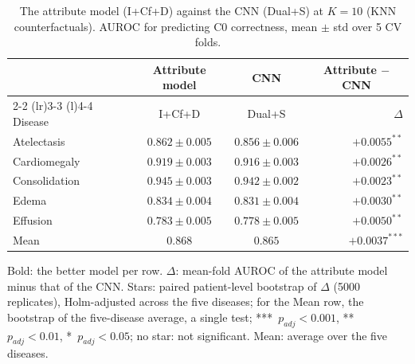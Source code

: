\begin{table}[htbp]
\centering
\small
\caption{The attribute model (I+Cf+D) against the CNN (Dual+S) at $K=10$ (KNN counterfactuals). AUROC for predicting C0 correctness, mean $\pm$ std over 5 CV folds.}
\label{tab:attr_vs_cnn_knn}
\begin{threeparttable}
\begin{tabular}{lcc|r}
\toprule
& \multicolumn{1}{c}{Attribute model} & \multicolumn{1}{c|}{CNN} & \multicolumn{1}{c}{Attribute $-$ CNN} \\
\cmidrule(lr){2-2} \cmidrule(lr){3-3} \cmidrule(l){4-4}
Disease & I+Cf+D & Dual+S & $\Delta$ \\
\midrule
Atelectasis & $\mathbf{0.862} \pm 0.005$ & $0.856 \pm 0.006$ & $+0.0055^{**}$ \\
Cardiomegaly & $\mathbf{0.919} \pm 0.003$ & $0.916 \pm 0.003$ & $+0.0026^{**}$ \\
Consolidation & $\mathbf{0.945} \pm 0.003$ & $0.942 \pm 0.002$ & $+0.0023^{**}$ \\
Edema & $\mathbf{0.834} \pm 0.004$ & $0.831 \pm 0.004$ & $+0.0030^{**}$ \\
Effusion & $\mathbf{0.783} \pm 0.005$ & $0.778 \pm 0.005$ & $+0.0050^{**}$ \\
Mean & $\mathbf{0.868}$ & $0.865$ & $+0.0037^{***}$ \\
\bottomrule
\end{tabular}
\begin{tablenotes}\footnotesize
\item Bold: the better model per row. $\Delta$: mean-fold AUROC of the attribute model minus that of the CNN. Stars: paired patient-level bootstrap of $\Delta$ (5000 replicates), Holm-adjusted across the five diseases; for the Mean row, the bootstrap of the five-disease average, a single test; ***~$p_{adj} < 0.001$, **~$p_{adj} < 0.01$, *~$p_{adj} < 0.05$; no star: not significant. Mean: average over the five diseases.
\end{tablenotes}
\end{threeparttable}
\end{table}

